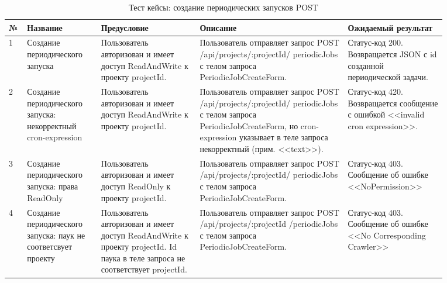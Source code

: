 \documentclass[a4paper,12pt]{article}
\begin{document}
	\begin{table}[hbt]
		\centering
		\begin{tabular}{|p{0.02\linewidth}|p{0.15\linewidth}|p{0.2\linewidth}|p{0.3\linewidth}|p{0.2\linewidth}|} 
			\hline
			\textbf{№} & \textbf{Название} & \textbf{Предусловие} & \textbf{Описание} & \textbf{Ожидаемый результат} \\ \hline
			1 & Создание периодического запуска & Пользователь авторизован и имеет доступ ReadAndWrite к проекту projectId. & Пользователь отправляет запрос POST     /api/projects/:projectId/ periodicJobs с телом запроса PeriodicJobCreateForm. & Статус-код 200. Возвращается JSON с id созданной периодической задачи. \\ \hline
			
			2 & Создание периодического запуска: некорректный cron-expression & Пользователь авторизован и имеет доступ ReadAndWrite к проекту projectId.  & Пользователь отправляет запрос POST     /api/projects/:projectId/ periodicJobs с телом запроса PeriodicJobCreateForm, но cron-expression указывает в теле запроса некорректный (прим. <<text>>). & Статус-код 420. Возвращается сообщение с ошибкой <<invalid cron expression>>. \\ \hline
			
			3 & Создание периодического запуска: права ReadOnly & Пользователь авторизован и имеет доступ ReadOnly к проекту projectId.  &  Пользователь отправляет запрос POST     /api/projects/:projectId/ periodicJobs с телом запроса PeriodicJobCreateForm. & Статус-код 403. Сообщение об ошибке <<NoPermission>> \\ \hline
			
			4 & Создание периодического запуска: паук не соответсвует проекту & Пользователь авторизован и имеет доступ ReadAndWrite к проекту projectId. Id паука в теле запроса не соответствует projectId. & Пользователь отправляет запрос POST     /api/projects/:projectId /periodicJobs с телом запроса PeriodicJobCreateForm. & Статус-код 403. Сообщение об ошибке <<No Corresponding Crawler>> \\ \hline
	\end{tabular}
	\caption{Тест кейсы: создание периодических запусков POST}
	\end{table} 	
	
\end{document}
